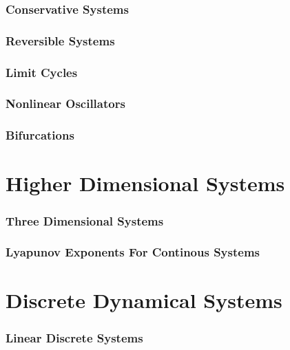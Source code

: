 \documentclass[a4paper]{article}
\numberwithin{equation}{section}
\numberwithin{figure}{section}
\numberwithin{table}{section}
\theoremstyle{remark}
\begin{document}
\section{Conservative Systems}


\section{Reversible Systems}


\section{Limit Cycles}{\label{sec:lc}}


\section{Nonlinear Oscillators}


\section{Bifurcations}{\label{sec:bf2d}}


\newpage
\part{Higher Dimensional Systems}


\section{Three Dimensional Systems}


\section{Lyapunov Exponents For Continous Systems}


\newpage
\part{Discrete Dynamical Systems}

\section{Linear Discrete Systems}

\end{document}
